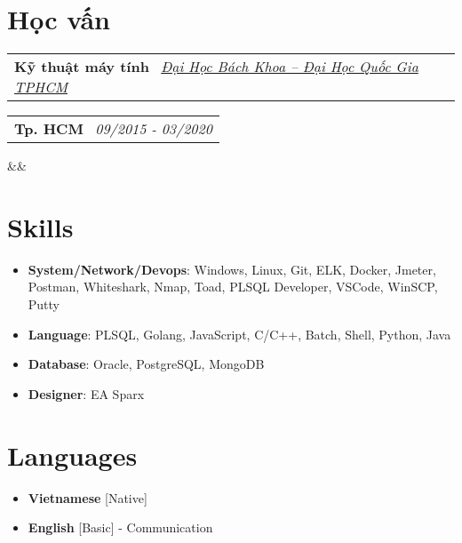 \documentclass[11pt,a4paper,sans]{moderncv}
\makeatletter
\newcommand*{\customcventry}[7][.13em]{
\begin{tabular}{@{}l}
{\bfseries #4} \
{\itshape #3}
\end{tabular}
\hfill
\begin{tabular}{l@{}}
{\bfseries #5} \
{\itshape #2}
\end{tabular}
\ifx&#7&%
\else{\
\begin{minipage}{\maincolumnwidth}%
\small#7%
\end{minipage}}\fi%
\par\addvspace{#1}}
\makeatother
\begin{document}
\section{Học vấn}
\customcventry{09/2015 - 03/2020}{\color{blue}\href{https://hcmut.edu.vn/}{Đại Học Bách Khoa – Đại Học Quốc Gia TPHCM}}{Kỹ thuật máy tính}{Tp. HCM}{}{}{Relevant Courses: Software and Hardware, Data Visualization, Business Intelligence, Digital Marketing, Time Series Analysis \& Forecasting.}

\section{Skills}
{\begin{itemize}[label={\textbullet}]
	\item \textbf{System/Network/Devops}: Windows, Linux, Git, ELK, Docker, Jmeter, Postman, Whiteshark, Nmap, Toad, PLSQL Developer, VSCode, WinSCP, Putty
	\item \textbf{Language}: PLSQL, Golang, JavaScript, C/C++, Batch, Shell, Python, Java  
	\item \textbf{Database}: Oracle, PostgreSQL, MongoDB
	\item \textbf{Designer}: EA Sparx
\end{itemize}}

\section{Languages}
\begin{multicols}{2}
    \begin{itemize}[label=\textbullet]
    \item \textbf{Vietnamese} [Native]
    \item {\textbf{English} [Basic] - Communication}
    \end{itemize}
\end{multicols}
\end{document}
